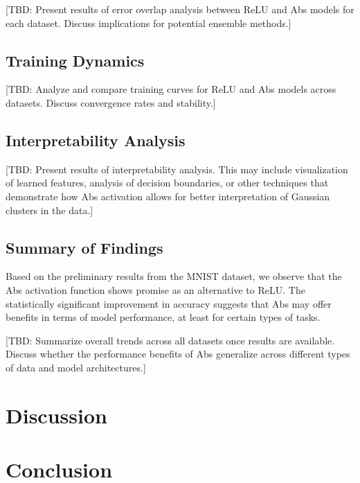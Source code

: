 \documentclass[11pt]{article}
\begin{document}
[TBD: Present results of error overlap analysis between ReLU and Abs models for each dataset. Discuss implications for potential ensemble methods.]

\subsection{Training Dynamics}

[TBD: Analyze and compare training curves for ReLU and Abs models across datasets. Discuss convergence rates and stability.]

\subsection{Interpretability Analysis}

[TBD: Present results of interpretability analysis. This may include visualization of learned features, analysis of decision boundaries, or other techniques that demonstrate how Abs activation allows for better interpretation of Gaussian clusters in the data.]

\subsection{Summary of Findings}

Based on the preliminary results from the MNIST dataset, we observe that the Abs activation function shows promise as an alternative to ReLU. The statistically significant improvement in accuracy suggests that Abs may offer benefits in terms of model performance, at least for certain types of tasks.

[TBD: Summarize overall trends across all datasets once results are available. Discuss whether the performance benefits of Abs generalize across different types of data and model architectures.]

\section{Discussion}


\section{Conclusion}




\end{document}
